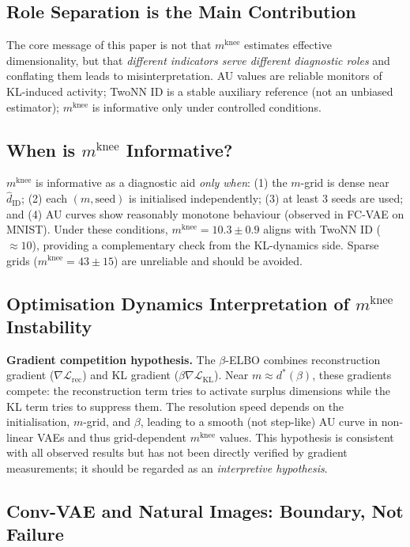 \documentclass[11pt,a4paper]{article}
\newcommand{\mknee}{m^{\mathrm{knee}}}
\newcommand{\hatdID}{\hat{d}_{\mathrm{ID}}}
\begin{document}
\subsection{Role Separation is the Main Contribution}\label{sec:disc_roles}

The core message of this paper is not that $\mknee$ estimates effective
dimensionality, but that \emph{different indicators serve different diagnostic
roles} and conflating them leads to misinterpretation.
AU values are reliable monitors of KL-induced activity; TwoNN ID is a stable
auxiliary reference (not an unbiased estimator); $\mknee$ is informative only
under controlled conditions.

\subsection{When is $\mknee$ Informative?}\label{sec:disc_mknee}

$\mknee$ is informative as a diagnostic aid \emph{only when}:
(1) the $m$-grid is dense near $\hatdID$; (2) each $(m,\text{seed})$ is
initialised independently; (3) at least 3 seeds are used; and
(4) AU curves show reasonably monotone behaviour (observed in FC-VAE on MNIST).
Under these conditions, $\mknee=10.3\pm0.9$ aligns with TwoNN ID ($\approx10$),
providing a complementary check from the KL-dynamics side.
Sparse grids ($\mknee=43\pm15$) are unreliable and should be avoided.

\subsection{Optimisation Dynamics Interpretation of $\mknee$ Instability}
\label{sec:disc_grad}

\textbf{Gradient competition hypothesis.}
The $\beta$-ELBO combines reconstruction gradient ($\nabla\mathcal{L}_{\mathrm{rec}}$)
and KL gradient ($\beta\nabla\mathcal{L}_{\mathrm{KL}}$).
Near $m\approx d^*(\beta)$, these gradients compete: the reconstruction term
tries to activate surplus dimensions while the KL term tries to suppress them.
The resolution speed depends on the initialisation, $m$-grid, and $\beta$,
leading to a smooth (not step-like) AU curve in non-linear VAEs and thus
grid-dependent $\mknee$ values.
This hypothesis is consistent with all observed results but has not been
directly verified by gradient measurements; it should be regarded as an
\emph{interpretive hypothesis}.

\subsection{Conv-VAE and Natural Images: Boundary, Not Failure}\label{sec:disc_boundary}
\end{document}
